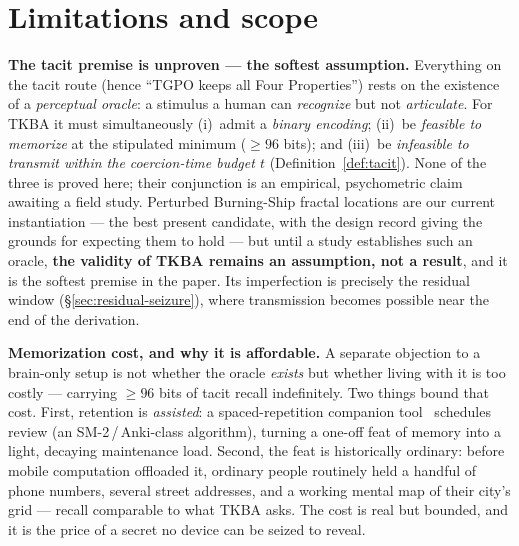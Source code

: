 \section{Limitations and scope}
\label{sec:limits}

\textbf{The tacit premise is unproven --- the softest assumption.} Everything on
the tacit route (hence ``TGPO keeps all Four Properties'') rests on the existence
of a \emph{perceptual oracle}: a stimulus a human can \emph{recognize} but not
\emph{articulate}. For TKBA it must simultaneously (i)~admit a \emph{binary
encoding}; (ii)~be \emph{feasible to memorize} at the stipulated minimum ($\ge 96$
bits); and (iii)~be \emph{infeasible to transmit within the coercion-time budget $t$}
(Definition~\ref{def:tacit}). None of the three is proved here; their conjunction
is an empirical, psychometric claim awaiting a field study. Perturbed Burning-Ship
fractal locations are our current instantiation --- the best present candidate,
with the design record giving the grounds for expecting them to hold --- but until
a study establishes such an oracle, \textbf{the validity of TKBA remains an
assumption, not a result}, and it is the softest premise in the paper. Its
imperfection is precisely the residual window (\S\ref{sec:residual-seizure}), where
transmission becomes possible near the end of the derivation.

\textbf{Memorization cost, and why it is affordable.} A separate objection to a
brain-only setup is not whether the oracle \emph{exists} but whether living with it
is too costly --- carrying $\ge 96$ bits of tacit recall indefinitely. Two things
bound that cost. First, retention is \emph{assisted}: a spaced-repetition
companion tool~\cite{gw-cpnf} schedules review (an
SM-2\,/\,Anki-class algorithm), turning a one-off feat of memory into a light,
decaying maintenance load. Second, the feat is historically ordinary: before mobile
computation offloaded it, ordinary people routinely held a handful of phone numbers,
several street addresses, and a working mental map of their city's grid --- recall
comparable to what TKBA asks. The cost is real but bounded, and it is the price of a
secret no device can be seized to reveal.

